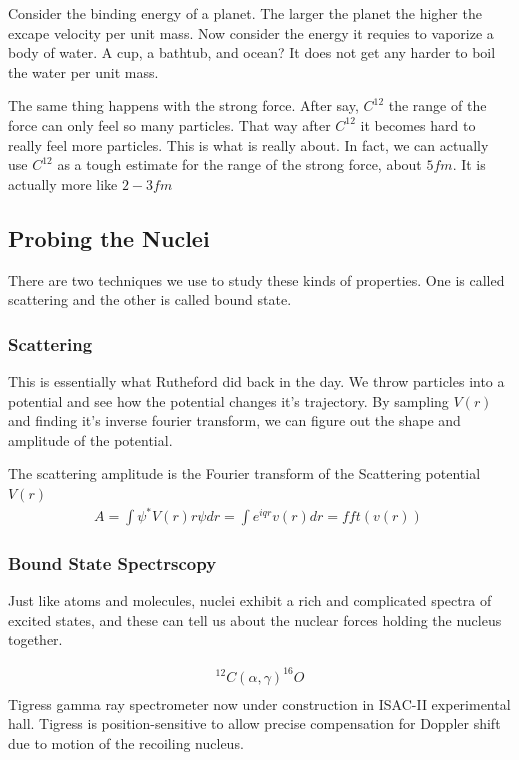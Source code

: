 \documentclass[english, 11pt]{article}
\begin{document}
        Consider the binding energy of a planet. The larger the planet the higher the excape velocity per unit mass. Now consider the energy it requies to vaporize a body of water. A cup, a bathtub, and ocean? It does not get any harder to boil the water per unit mass. 

        The same thing happens with the strong force. After say, $C^{12}$ the range of the force can only feel so many particles. That way after $C^{12}$ it becomes hard to really feel more particles. This is what  is really about. In fact, we can actually use $C^{12}$ as a tough estimate for the range of the strong force, about $5fm$. It is actually more like $2-3 fm$
  
      \subsection{Probing the Nuclei}
        There are two techniques we use to study these kinds of properties. One is called scattering and the other is called bound state.

      \subsubsection*{Scattering}
        This is essentially what Rutheford did back in the day. We throw particles into a potential and see how the potential changes it's trajectory. By sampling $V(r)$ and finding it's inverse fourier transform, we can figure out the shape and amplitude of the potential.

      \begin{defn}
      The scattering amplitude is the Fourier transform of the Scattering potential $V(r)$
        \begin{align*}
          A = \int \psi^{*}V(r)r\psi dr = \int e^{iqr}v(r)dr = fft(v(r))\
        \end{align*}
      \end{defn}

      \subsubsection{Bound State Spectrscopy}
      Just like atoms and molecules, nuclei exhibit a rich and complicated spectra of excited states, and these can tell us about the nuclear forces holding the nucleus together.

      \begin{align*}
        ^12C(\alpha,\gamma)^16O\\
      \end{align*}
      Tigress gamma ray spectrometer now under construction in ISAC-II experimental hall. Tigress is position-sensitive to allow precise compensation for Doppler shift due to motion of the recoiling nucleus. 
\end{document}
